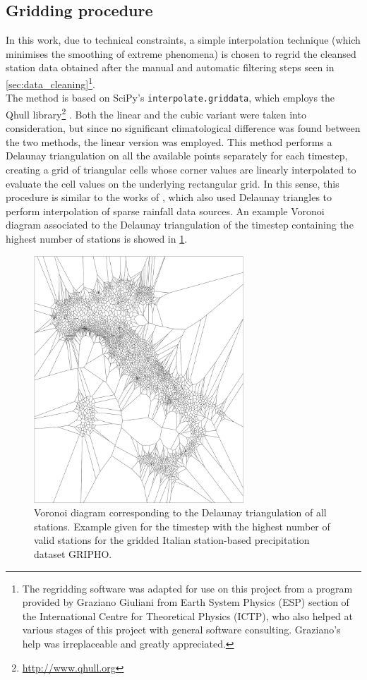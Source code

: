 \subsection{Gridding procedure}
In this work, due to technical constraints, a simple interpolation technique (which minimises the smoothing of extreme phenomena) is chosen to regrid the cleansed station data obtained after the manual and automatic filtering steps seen in \cref{sec:data_cleaning}\footnote{
    The regridding software was adapted for use on this project from a program provided by Graziano Giuliani from Earth System Physics (ESP) section of the International Centre for Theoretical Physics (ICTP), who also helped at various stages of this project with general software consulting. Graziano's help was irreplaceable and greatly appreciated.
}.\\ 
The method is based on SciPy's \citep{Jones2007} \texttt{interpolate.griddata}, which employs the Qhull library\footnote{\url{http://www.qhull.org}} \citep{Barber1996}. 
Both the linear and the cubic variant were taken into consideration, but since no significant climatological difference was found between the two methods, the linear version was employed.
This method performs a Delaunay triangulation \citep{Aurenhammer1991} on all the available points separately for each timestep, creating a grid of triangular cells whose corner values are linearly interpolated to evaluate the cell values on the underlying rectangular grid.
In this sense, this procedure is similar to the works of \citet{Velasquez2011,Mohr2008}, which also used Delaunay triangles to perform interpolation of sparse rainfall data sources.
An example Voronoi diagram associated to the Delaunay triangulation of the timestep containing the highest number of stations is showed in \cref{fig:voronoi}.
\begin{figure}
    \centering
    \includegraphics[width=0.7\textwidth]{figures/voronoi}
    \decoRule
    \caption[Example Voronoi diagram for the creation of the precipitation dataset GRIPHO]{Voronoi diagram corresponding to the Delaunay triangulation  of all stations. Example given for the timestep with the highest number of valid stations for the gridded Italian station-based precipitation dataset GRIPHO.} \label{fig:voronoi}
\end{figure}
